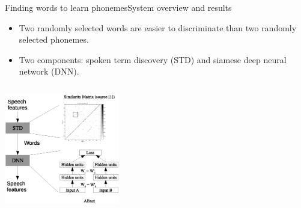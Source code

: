 \documentclass{beamer}
\begin{document}
\begin{frame}{Finding words to learn phonemes}{System overview and results}
  \begin{itemize}
  \item {
    Two randomly selected words are easier to discriminate than two randomly selected phonemes.
  }
  \item {
    Two components: spoken term discovery (STD) and siamese deep neural network (DNN).
  }
  \end{itemize}
  \begin{columns}[onlytextwidth]
    \begin{column}{0.5\textwidth}
        \includegraphics[width=5cm]{system_overview.eps}
    \end{column}
\end{columns}

\end{frame}
\end{document}
